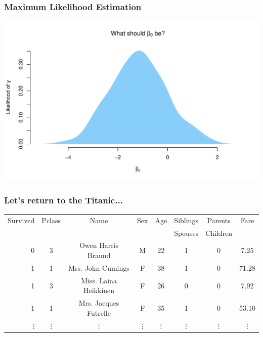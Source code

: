 \documentclass[aspectratio=169]{beamer}
\begin{document}
\begin{frame}
\frametitle{Maximum Likelihood Estimation}

\begin{center}
\includegraphics[scale=0.55]{MLE.pdf}
\end{center}

\end{frame}

\begin{frame}
\frametitle{Let's return to the Titanic...}

\begin{table}
\begin{tabular}{r | c | c | c | c | c | c | c}
Survived & Pclass  & Name & Sex & Age & Siblings & Parents & Fare\\
 &   &  &  &  & Spouses & Children & \\
\hline \hline
0 & 3 & Owen Harris Braund &M&22&1&0&7.25\\ 
 1 & 1 & Mrs. John Cumings &F&38&1&0&71.28\\ 
  1 & 3 & Miss. Laina Heikkinen &F&26&0&0&7.92\\ 
   1 & 1 & Mrs. Jacques Futrelle &F&35&1&0&53.10\\ 
   $\vdots$ & $\vdots$ & $\vdots$ &$\vdots$&$\vdots$&$\vdots$&$\vdots$&$\vdots$\\ 
\end{tabular}
\end{table}

\end{frame}
\end{document}
